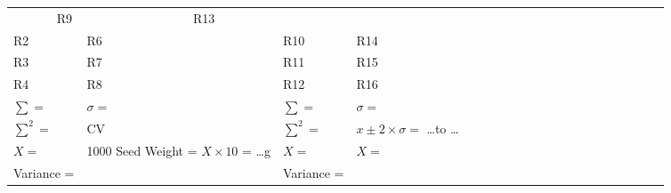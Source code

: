 \documentclass[12pt]{article}\usepackage[]{graphicx}\usepackage[]{color}
\begin{document}
\begin{table}[h]
{\begin{minipage}{1\textwidth}
\begin{tabular}{|llllllllllll|llllllllllllllll}
  \multicolumn{1}{l|}{} &
  \multicolumn{1}{l|}{} &
  \multicolumn{1}{l|}{R9} &
  \multicolumn{1}{l|}{} &
  \multicolumn{1}{l|}{} &
  \multicolumn{1}{l|}{R13} &
  \multicolumn{1}{l|}{} &
   &
   &
   &
   &
   &
   &
   &
   &
   &
   &
   &
   &
   &
   &
   &
   &
   \\ \cline{1-12}
\multicolumn{1}{|l|}{R2} &
  \multicolumn{1}{l|}{} &
  \multicolumn{1}{l|}{} &
  \multicolumn{1}{l|}{R6} &
  \multicolumn{1}{l|}{} &
  \multicolumn{1}{l|}{} &
  \multicolumn{1}{l|}{R10} &
  \multicolumn{1}{l|}{} &
  \multicolumn{1}{l|}{} &
  \multicolumn{1}{l|}{R14} &
  \multicolumn{1}{l|}{} &
   &
   &
   &
   &
   &
   &
   &
   &
   &
   &
   &
   &
   &
   &
   &
   &
   \\ \cline{1-12}
\multicolumn{1}{|l|}{R3} &
  \multicolumn{1}{l|}{} &
  \multicolumn{1}{l|}{} &
  \multicolumn{1}{l|}{R7} &
  \multicolumn{1}{l|}{} &
  \multicolumn{1}{l|}{} &
  \multicolumn{1}{l|}{R11} &
  \multicolumn{1}{l|}{} &
  \multicolumn{1}{l|}{} &
  \multicolumn{1}{l|}{R15} &
  \multicolumn{1}{l|}{} &
   &
   &
   &
   &
   &
   &
   &
   &
   &
   &
   &
   &
   &
   &
   &
   &
   \\ \cline{1-12}
\multicolumn{1}{|l|}{R4} &
  \multicolumn{1}{l|}{} &
  \multicolumn{1}{l|}{} &
  \multicolumn{1}{l|}{R8} &
  \multicolumn{1}{l|}{} &
  \multicolumn{1}{l|}{} &
  \multicolumn{1}{l|}{R12} &
  \multicolumn{1}{l|}{} &
  \multicolumn{1}{l|}{} &
  \multicolumn{1}{l|}{R16} &
  \multicolumn{1}{l|}{} &
   &
   &
   &
   &
   &
   &
   &
   &
   &
   &
   &
   &
   &
   &
   &
   &
   \\ \cline{1-12}
\multicolumn{3}{|l|}{$\sum=$} &
  \multicolumn{3}{l|}{$\sigma = $} &
  \multicolumn{3}{l|}{$\sum=$} &
  \multicolumn{3}{l|}{$\sigma = $} &
   &
   &
   &
   &
   &
   &
   &
   &
   &
   &
   &
   &
   &
   &
   &
   \\ \cline{1-12}
\multicolumn{3}{|l|}{$\sum^2=$} &
  \multicolumn{3}{l|}{CV} &
  \multicolumn{3}{l|}{$\sum^2=$} &
  \multicolumn{3}{l|}{$x \pm 2\times \sigma = $ \ldots to \ldots} &
   &
   &
   &
   &
   &
   &
   &
   &
   &
   &
   &
   &
   &
   &
   &
   \\ \cline{1-12}
\multicolumn{3}{|l|}{$X=$} &
  \multicolumn{3}{l|}{\multirow{2}{*}{1000 Seed Weight = $X \times 10$ = \ldots g}} &
  \multicolumn{3}{l|}{$X=$} &
  \multicolumn{3}{l|}{$X =$} &
   &
   &
   &
   &
   &
   &
   &
   &
   &
   &
   &
   &
   &
   &
   &
   \\ \cline{1-3} \cline{7-12}
\multicolumn{3}{|l|}{Variance =} &
  \multicolumn{3}{l|}{} &
  \multicolumn{3}{l|}{Variance =} &

\end{tabular}
\end{minipage}}
\end{table}
\end{document}
